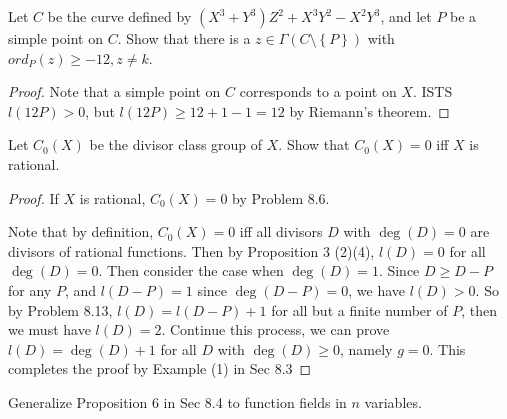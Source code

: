\documentclass{solution}
\begin{document}
\begin{problem}{8.20}
    Let $C$ be the curve defined by $(X^3 + Y^3)Z^2 + X^3Y^2 - X^2Y^3$, and let $P$ be a simple point on $C$. Show that there is a $z \in \Gamma(C \setminus \left\lbrace P \right\rbrace)$ with $ord_P(z) \ge -12, z \ne k$.
\end{problem}

\begin{proof}
    Note that a simple point on $C$ corresponds to a point on $X$. ISTS $l(12P) \gt 0$, but $l(12P) \ge 12 + 1 - 1 = 12$ by Riemann's theorem.
\end{proof}

\begin{problem}{8.21}
    Let $C_0(X)$ be the divisor class group of $X$. Show that $C_0(X) = 0$ iff $X$ is rational.
\end{problem}

\begin{proof}
    If $X$ is rational, $C_0(X) = 0$ by Problem 8.6.

    Note that by definition, $C_0(X) = 0$ iff all divisors $D$ with $\deg(D) = 0$ are divisors of rational functions. Then by Proposition 3 (2)(4), $l(D) = 0$ for all $\deg(D) = 0$. Then consider the case when $\deg(D) = 1$. Since $D \ge D - P$ for any $P$, and $l(D - P) = 1$ since $\deg(D - P) = 0$, we have $l(D) \gt 0$. So by Problem 8.13, $l(D) = l(D - P) + 1$ for all but a finite number of $P$, then we must have $l(D) = 2$. Continue this process, we can prove $l(D) = \deg(D) + 1$ for all $D$ with $\deg(D) \ge 0$, namely $g = 0$. This completes the proof by Example (1) in Sec 8.3
\end{proof}

\begin{problem}{8.22}
    Generalize Proposition 6 in Sec 8.4 to function fields in $n$ variables.
\end{problem}
\end{document}
